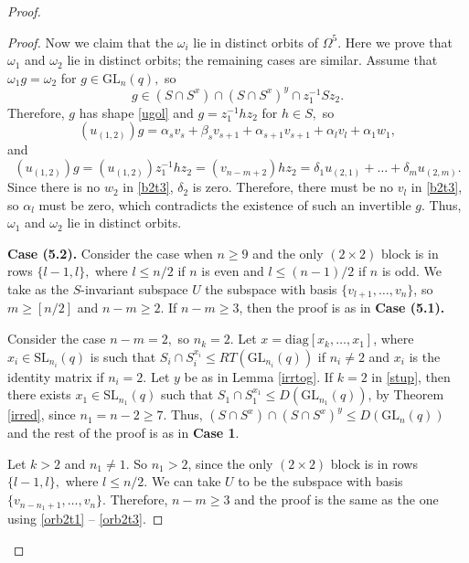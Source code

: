 \documentclass[a4paper,reqno,11pt]{amsart}
\theoremstyle{definition}
\theoremstyle{remark}
\numberwithin{equation}{section}
\newcommand{\diag}{\mathrm{diag}}
\newcommand{\SL}{{\mathrm{SL}}}
\newcommand{\GL}{{\mathrm{GL}}}
\begin{document}
\begin{proof}
\begin{proof}
Now we claim that  the $\omega_i$ lie in distinct orbits of $\Omega^5.$ Here we prove that $\omega_1$ and $\omega_2$  lie in distinct orbits;  the remaining cases are similar.  Assume that $\omega_1 g =\omega_2$ for $g \in \GL_n(q),$ so 
$$g \in (S \cap S^x) \cap (S \cap S^x)^y \cap z_1^{-1}Sz_2.$$
Therefore, $g$ has shape \eqref{ugol} and $g=z_1^{-1}hz_2$ for $h \in S,$ so 
\begin{equation}\label{b2t3}
(u_{(1,2)})g=\alpha_{s}v_s +\beta_s v_{s+1} + \alpha_{s+1} v_{s+1} +\alpha_{l}v_l+\alpha_1 w_1,
\end{equation}
and 
\begin{equation*}%
(u_{(1,2)})g=(u_{(1,2)})z_1^{-1}hz_2=(v_{n-m+2})hz_2 = \delta_1 u_{(2,1)} + \ldots + \delta_m u_{(2,m)}.
\end{equation*}
Since there is no $w_2$ in \eqref{b2t3}, $\delta_2$ is zero. Therefore, there must be no $v_l$ in \eqref{b2t3}, so $\alpha_l$ must be zero, which contradicts the existence of such an invertible $g.$ Thus, $\omega_1$ and $\omega_2$ lie in  distinct orbits. 

\medskip

{\bf Case (5.2).} Consider the case when $n \ge 9$ and the only $(2\times 2)$ block is in  rows $\{l-1,l\},$ where $l \le n/2$ if $n$ is even and $l \le (n-1)/2$ if $n$ is odd. We take as the $S$-invariant subspace $U$ the subspace with  basis $\{v_{l+1}, \ldots, v_n\}$, so
$m\ge [n/2]$ and $n-m \ge 2.$  If $n-m \ge 3$, then the proof is  as in {\bf Case (5.1).} 

 Consider the case  $n-m=2,$ so $n_k=2$. Let $x= \diag[x_k, \ldots, x_1]$, where $x_i\in \SL_{n_i}(q)$ is such that $S_i \cap S_i^{x_i} \le RT(\GL_{n_i}(q))$ if $n_i \ne 2$ and $x_i$ is the identity matrix if $n_i=2.$ Let $y$ be as in Lemma \ref{irrtog}. If $k=2$ in \eqref{stup}, then there exists $x_1 \in \SL_{n_1}(q)$ such that $S_1 \cap S_1^{x_1} \le D(\GL_{n_1}(q))$, by %
Theorem \ref{irred}, since $n_1=n-2\ge 7.$ Thus, $(S\cap S^x) \cap (S\cap S^x)^y \le D(\GL_n(q))$ and the rest of the proof is as in {\bf Case 1}.

Let $k>2$ and $n_1 \ne 1$. So $n_1 >2$, since the only $(2\times 2)$ block is in  rows $\{l-1,l\},$ where $l \le n/2$. %
We can take $U$ to be the subspace with  basis $\{v_{n -n_1+1}, \ldots, v_n\}$. Therefore, $n-m\ge 3$  and the proof is the same as the one using \eqref{orb2t1} -- \eqref{orb2t3}. 


\end{proof}
\end{proof}
\end{document}
